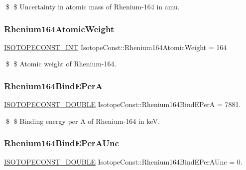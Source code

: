 \$ \$ Uncertainty in atomic mass of Rhenium-\/164 in amu. \mbox{\label{group___isotope_const-_rhenium-_re164_gaf48961780d2b226c9d1f8c469865105e}} 
\subsubsection{\texorpdfstring{Rhenium164\+Atomic\+Weight}{Rhenium164AtomicWeight}}
{\footnotesize\ttfamily \mbox{\hyperlink{group___isotope_const-_macros_ga5f18360b3e99483a35c32d789e62621c}{I\+S\+O\+T\+O\+P\+E\+C\+O\+N\+S\+T\+\_\+\+I\+NT}} Isotope\+Const\+::\+Rhenium164\+Atomic\+Weight = 164}

\$ \$ Atomic weight of Rhenium-\/164. \mbox{\label{group___isotope_const-_rhenium-_re164_ga1c548f6bc469b4ee1c49129253571e97}} 
\subsubsection{\texorpdfstring{Rhenium164\+Bind\+E\+PerA}{Rhenium164BindEPerA}}
{\footnotesize\ttfamily \mbox{\hyperlink{group___isotope_const-_macros_ga8f45a7272ce02c0b4c65c44636ed719a}{I\+S\+O\+T\+O\+P\+E\+C\+O\+N\+S\+T\+\_\+\+D\+O\+U\+B\+LE}} Isotope\+Const\+::\+Rhenium164\+Bind\+E\+PerA = 7881.}

\$ \$ Binding energy per A of Rhenium-\/164 in keV. \mbox{\label{group___isotope_const-_rhenium-_re164_ga0d4dd73d083e2e87701817bc3680cc59}} 
\subsubsection{\texorpdfstring{Rhenium164\+Bind\+E\+Per\+A\+Unc}{Rhenium164BindEPerAUnc}}
{\footnotesize\ttfamily \mbox{\hyperlink{group___isotope_const-_macros_ga8f45a7272ce02c0b4c65c44636ed719a}{I\+S\+O\+T\+O\+P\+E\+C\+O\+N\+S\+T\+\_\+\+D\+O\+U\+B\+LE}} Isotope\+Const\+::\+Rhenium164\+Bind\+E\+Per\+A\+Unc = 0.}

